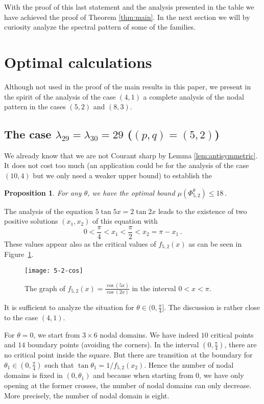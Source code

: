 \documentclass[a4paper,reqno,11pt]{amsart}
\newtheorem{prop}[thm]{Proposition}
\theoremstyle{remark}
\theoremstyle{definition}
\numberwithin{equation}{section}
\begin{document}
With the proof of this last statement and the analysis presented in the table we have achieved the proof of Theorem \ref{thm:main}.  In the next section we will by curiosity analyze the spectral pattern of some of the families.

\section{Optimal calculations}\label{Section8}

Although not used in the proof of the main results in this paper, we present 
in the spirit of the analysis of the case $(4,1)$ a complete analysis of 
the nodal pattern in the cases $(5,2)$ and $(8,3)$.

\subsection{The case $\lambda_{29}=\lambda_{30}= 29$ ($(p,q)= (5,2)$)}
We already know that we are 
not Courant sharp by Lemma \ref{lem:antisymmetric}.  It does not cost too much (an 
application could be for the analysis of the case $(10,4)$ but we only need a 
weaker upper bound) to establish the
\begin{prop}
\label{lem:5-2}
For any $\theta$, we have the optimal bound  $\mu(\Phi_{5,2}^\theta) \leq 18\,$. 
\end{prop}

The analysis of the equation $5 \tan 5x = 2 \tan 2x$ leads to the existence of 
two positive solutions $(x_1,x_2)$ of this equation with 
\[
0 <\frac \pi 4 <  x_1 <\frac \pi 2 < x_2 = \pi -x_1\,.
\]
These values appear also as the critical values of $f_{5,2}(x)$ as can be seen 
in Figure~\ref{fig:5-2-cos}.
\begin{figure}[htbp]
\centering
\texttt{[image: 5-2-cos]}
\caption{The graph of $f_{5,2}(x)=\frac{\cos(5x)}{\cos(2x)}$ in the interval 
$0<x<\pi$.}
\label{fig:5-2-cos}
\end{figure}

It is sufficient to analyze the situation for $\theta \in (0,\frac \pi 4]$.  
The discussion is rather close to the case $(4,1)$.

For $\theta =0$, we start from $3\times 6$ nodal domains. We have indeed $10$ 
critical points and $14$ boundary points (avoiding the corners).
In the interval $(0,\frac \pi 4)$, there are no critical point inside the 
square.  But there are transition at the boundary for 
$\theta_1\in (0,\frac \pi 4)$ such that $\tan \theta_1= 1/ f_{5,2}(x_2)$. Hence 
the number of nodal domains is fixed  in $(0,\theta_1)$
and because when starting from $0$, we have only opening at the former crosses, 
the number of nodal domains can only decrease. More precisely, the number of 
nodal domain is eight.
\end{document}
